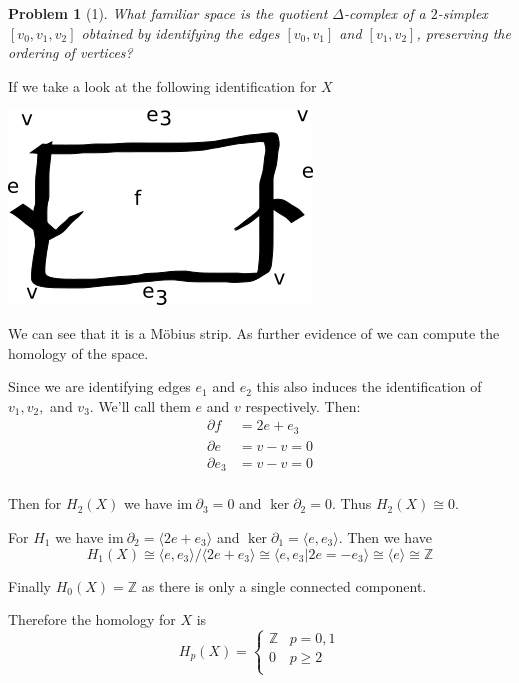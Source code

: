 \documentclass[10pt]{article}
\newcommand{\bb}[1]{\mathbb{#1}}
\newcommand{\ima}{\mathrm{im}\ }
\theoremstyle{plain}
\newtheorem{problem}{Problem}
\theoremstyle{remark}
\begin{document}
\begin{problem}[1]
  What familiar space is the quotient $\Delta$-complex of a $2$-simplex
  $[v_0,v_1,v_2]$ obtained by identifying the edges $[v_0,v_1]$ and
  $[v_1,v_2]$, preserving the ordering of vertices?
\end{problem}

If we take a look at the following identification for $X$\\

\begin{center}
\includegraphics[scale=.7]{mobius}  
\end{center}

We can see that it is a M\"obius strip. As further evidence of
we can compute the homology of the space.

Since we are identifying edges $e_1$ and $e_2$ this also induces the
identification of $v_1,v_2,$ and $v_3$. We'll call them $e$
and $v$ respectively. Then:
\begin{align*}
  \partial f &= 2e+e_3\\
  \partial e &= v-v = 0\\
  \partial e_3 &= v-v = 0\\
\end{align*}

Then for $H_2(X)$ we have $\ima \partial_3=0$ and $\ker \partial_2 = 0$.
Thus $H_2(X)\cong 0$.

For $H_1$ we have $\ima \partial_2=\langle 2e+e_3\rangle$ and $\ker\partial_1=\langle e,e_3\rangle$.
Then we have
\[ H_1(X)\cong\langle e,e_3\rangle/\langle 2e+e_3\rangle\cong\langle e,e_3|2e=-e_3\rangle\cong\langle e\rangle\cong \bb{Z}\]

Finally $H_0(X)=\bb{Z}$ as there is only a single connected component.

Therefore the homology for $X$ is
\[
  H_p(X)=
  \left\{
    \begin{array}{ll}
      \bb{Z} & p=0,1\\
      0 & p\geq 2\\
    \end{array}
  \right.
\]
\end{document}

